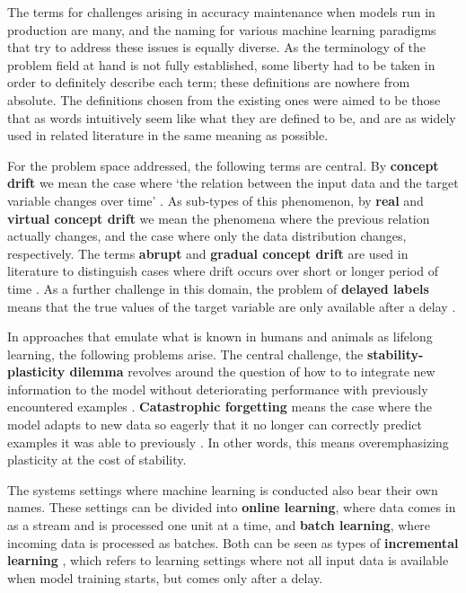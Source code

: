 
The terms for challenges arising in accuracy maintenance when models run in production are many, and the naming for various machine learning paradigms that try to address these issues is equally diverse. As the terminology of the problem field at hand is not fully established, some liberty had to be taken in order to definitely describe each term; these definitions are nowhere from absolute. The definitions chosen from the existing ones were aimed to be those that as words intuitively seem like what they are defined to be, and are as widely used in related literature in the same meaning as possible. 

For the problem space addressed, the following terms are central. By \textbf{concept drift} we mean the case where `the relation between the input
data and the target variable changes over time' \cite{conceptdriftsurvey}. As sub-types of this phenomenon, by \textbf{real} and \textbf{virtual concept drift} we mean the phenomena where the previous relation actually changes, and the case where only the data distribution changes, respectively. The terms \textbf{abrupt} and \textbf{gradual concept drift} are used in literature to distinguish cases where drift occurs over short or longer period of time \cite{zliobaite_driftsurvey}. As a further challenge in this domain, the problem of \textbf{delayed labels} means that the true values of the target variable are only available after a delay \cite{delayedlabelstreams}.

In approaches that emulate what is known in humans and animals as lifelong learning, the following problems arise. The central challenge, the \textbf{stability-plasticity dilemma} revolves around the question of how to to integrate new information to the model without deteriorating performance with previously encountered examples \cite{lmlinneuralnets}. \textbf{Catastrophic forgetting} means the case where the model adapts to new data so eagerly that it no longer can correctly predict examples it was able to previously \cite{lmlinneuralnets}. In other words, this means overemphasizing plasticity at the cost of stability.

The systems settings where machine learning is conducted also bear their own names. These settings can be divided into \textbf{online learning}, where data comes in as a stream and is processed one unit at a time, and \textbf{batch learning}, where incoming data is processed as batches. Both can be seen as types of \textbf{incremental learning} \cite{giraud-carrier_note_2000}, which refers to learning settings where not all input data is available when model training starts, but comes only after a delay.

